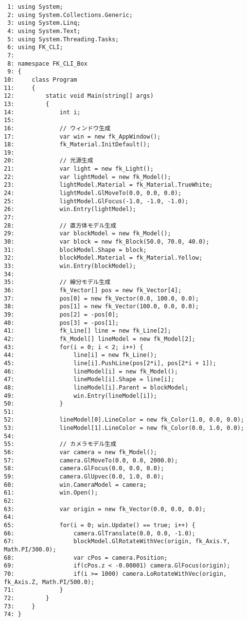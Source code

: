 \begin{breakbox}
\begin{small}
\begin{verbatim}
 1: using System;
 2: using System.Collections.Generic;
 3: using System.Linq;
 4: using System.Text;
 5: using System.Threading.Tasks;
 6: using FK_CLI;
 7: 
 8: namespace FK_CLI_Box
 9: {
10:     class Program
11:     {
12:         static void Main(string[] args)
13:         {
14:             int i;
15: 
16:             // ウィンドウ生成
17:             var win = new fk_AppWindow();
18:             fk_Material.InitDefault();
19: 
20:             // 光源生成
21:             var light = new fk_Light();
22:             var lightModel = new fk_Model();
23:             lightModel.Material = fk_Material.TrueWhite;
24:             lightModel.GlMoveTo(0.0, 0.0, 0.0);
25:             lightModel.GlFocus(-1.0, -1.0, -1.0);
26:             win.Entry(lightModel);
27: 
28:             // 直方体モデル生成
29:             var blockModel = new fk_Model();
30:             var block = new fk_Block(50.0, 70.0, 40.0);
31:             blockModel.Shape = block;
32:             blockModel.Material = fk_Material.Yellow;
33:             win.Entry(blockModel);
34: 
35:             // 線分モデル生成
36:             fk_Vector[] pos = new fk_Vector[4];
37:             pos[0] = new fk_Vector(0.0, 100.0, 0.0);
38:             pos[1] = new fk_Vector(100.0, 0.0, 0.0);
39:             pos[2] = -pos[0];
40:             pos[3] = -pos[1];
41:             fk_Line[] line = new fk_Line[2];
42:             fk_Model[] lineModel = new fk_Model[2];
43:             for(i = 0; i < 2; i++) {
44:                 line[i] = new fk_Line();
45:                 line[i].PushLine(pos[2*i], pos[2*i + 1]);
46:                 lineModel[i] = new fk_Model();
47:                 lineModel[i].Shape = line[i];
48:                 lineModel[i].Parent = blockModel;
49:                 win.Entry(lineModel[i]);
50:             }
51: 
52:             lineModel[0].LineColor = new fk_Color(1.0, 0.0, 0.0);
53:             lineModel[1].LineColor = new fk_Color(0.0, 1.0, 0.0);
54: 
55:             // カメラモデル生成
56:             var camera = new fk_Model();
57:             camera.GlMoveTo(0.0, 0.0, 2000.0);
58:             camera.GlFocus(0.0, 0.0, 0.0);
59:             camera.GlUpvec(0.0, 1.0, 0.0);
60:             win.CameraModel = camera;
61:             win.Open();
62: 
63:             var origin = new fk_Vector(0.0, 0.0, 0.0);
64: 
65:             for(i = 0; win.Update() == true; i++) {
66:                 camera.GlTranslate(0.0, 0.0, -1.0);
67:                 blockModel.GlRotateWithVec(origin, fk_Axis.Y, Math.PI/300.0);
68:                 var cPos = camera.Position;
69:                 if(cPos.z < -0.00001) camera.GlFocus(origin);
70:                 if(i >= 1000) camera.LoRotateWithVec(origin, fk_Axis.Z, Math.PI/500.0);
71:             }
72:         }
73:     }
74: }

\end{verbatim}
\end{small}
\end{breakbox}
~

